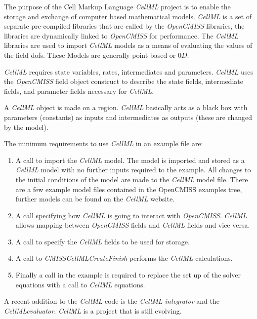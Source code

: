 The purpose of the Cell Markup Language \emph{CellML} project is to enable 
the storage and exchange of computer based mathematical models. 
\emph{CellML} is a set of separate pre-compiled libraries that are called by the 
\emph{OpenCMISS} libraries, the libraries are dynamically linked to \emph{OpenCMISS} 
for performance. The \emph{CellML} libraries are used to import \emph{CellML} models 
as a means of evaluating the values of the field dofs. These Models are generally 
point based or $0D$. 

\emph{CellML} requires state variables, rates, intermediates and parameters. 
\emph{CellML} uses the \emph{OpenCMISS} field object construct to describe the state 
fields, intermediate fields, and parameter fields necessary for \emph{CellML}.

A \emph{CellML} object is made on a region. \emph{CellML} basically acts as a black box with 
parameters (constants) as inputs and intermediates as outputs (these are
changed by the model). 

The minimum requirements to use \emph{CellML} in an example file are: 

\begin{enumerate}
 \item A call to import the \emph{CellML} model. The model is imported and stored as a
\emph{CellML} model with no further inputs required to the example. All changes to the 
initial conditions of the model are made to the \emph{CellML} model file. There are a 
few example model files contained in the OpenCMISS examples tree, further models can 
be found on the \emph{CellML} website.
 \item A call specifying how \emph{CellML} is going to interact with \emph{OpenCMISS}. 
\emph{CellML} allows mapping between \emph{OpenCMISS} fields and \emph{CellML} fields 
and vice versa. 
 \item A call to specify the \emph{CellML} fields to be used for storage. 
 \item A call to \emph{CMISSCellMLCreateFinish} performs the \emph{CellML} calculations.
 \item Finally a call in the example is required to replace the set up of the solver 
equations with a call to \emph{CellML} equations.
\end{enumerate}

\noindent A recent addition to the \emph{CellML} code is the \emph{CellML integrator} and the 
\emph{CellMLevaluator}. \emph{CellML} is a project that is still evolving.


